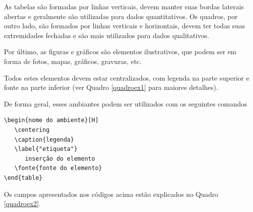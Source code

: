 As tabelas são formadas por linhas verticais, devem manter suas bordas laterais abertas e geralmente são utilizadas para dados quantitativos. Os quadros, por outro lado, são formados por linhas verticais e horizontais, devem ter todas suas extremidades fechadas e são mais utilizados para dados qualitativos.

Por último, as figuras e gráficos são elementos ilustrativos, que podem ser em forma de fotos, mapas, gráficos, gravuras, etc.

Todos estes elementos devem estar centralizados, com legenda na parte superior e fonte na parte inferior (ver Quadro \ref{quadroex1} para maiores detalhes).

De forma geral, esses ambiantes podem ser utilizados com os seguintes comandos



\begin{verbatim}
\begin{nome do ambiente}[H]
   \centering
   \caption{legenda}
   \label{"etiqueta"}
      inserção do elemento 
   \fonte{fonte do elemento}
\end{table}
\end{verbatim}
Os campos apresentados nos códigos acima estão explicados no Quadro \ref{quadroex2}.


